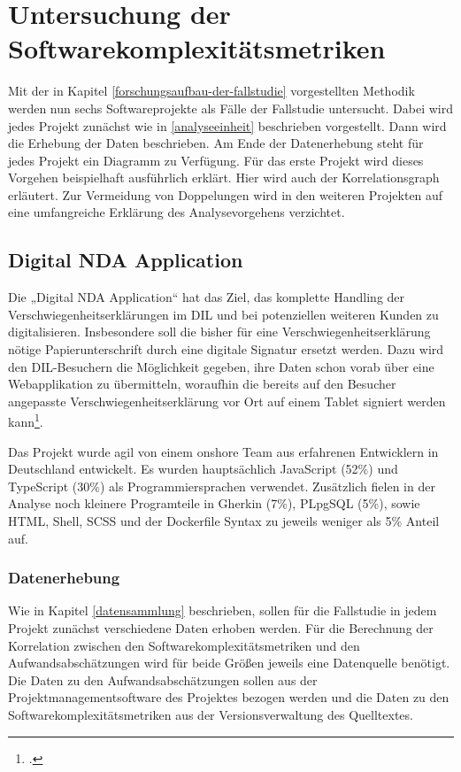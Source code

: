 \chapter{Untersuchung der Softwarekomplexitätsmetriken}\label{untersuchung-der-softwarekomplexituxe4tsmetriken}

Mit der in Kapitel \ref{forschungsaufbau-der-fallstudie} vorgestellten Methodik werden nun sechs
Softwareprojekte als Fälle der Fallstudie untersucht. Dabei wird jedes
Projekt zunächst wie in \ref{analyseeinheit} beschrieben vorgestellt. Dann wird die
Erhebung der Daten beschrieben. Am Ende der Datenerhebung steht für
jedes Projekt ein Diagramm zu Verfügung. Für das erste Projekt wird
dieses Vorgehen beispielhaft ausführlich erklärt. Hier wird auch der
Korrelationsgraph erläutert. Zur Vermeidung von Doppelungen wird in den
weiteren Projekten auf eine umfangreiche Erklärung des Analysevorgehens
verzichtet.

\section{Digital NDA Application}\label{digital-nda-application}

Die „Digital \ac{NDA} Application`` hat das Ziel, das komplette Handling der
Verschwiegenheitserklärungen im \ac{DIL} und bei potenziellen weiteren Kunden
zu digitalisieren. Insbesondere soll die bisher für eine
Verschwiegenheitserklärung nötige Papierunterschrift durch eine digitale
Signatur ersetzt werden. Dazu wird den \ac{DIL}-Besuchern die Möglichkeit
gegeben, ihre Daten schon vorab über eine Webapplikation zu übermitteln,
woraufhin die bereits auf den Besucher angepasste
Verschwiegenheitserklärung vor Ort auf einem Tablet signiert werden
kann\footcite[Vgl. ][]{dxctechnologiesInternesDokumentAufbau2022}.

Das Projekt wurde agil von einem onshore Team aus erfahrenen Entwicklern
in Deutschland entwickelt. Es wurden hauptsächlich JavaScript
(52\%) und TypeScript (30\%)
als Programmiersprachen verwendet. Zusätzlich fielen in der Analyse noch
kleinere Programteile in Gherkin (7\%), PLpgSQL (5\%), sowie \ac{HTML},
Shell, SCSS und der Dockerfile Syntax zu jeweils weniger als 5\% Anteil
auf.

\subsection{Datenerhebung}\label{nda-Datenerhebung}

Wie in Kapitel \ref{datensammlung} beschrieben, sollen für die Fallstudie in jedem
Projekt zunächst verschiedene Daten erhoben werden. Für die Berechnung
der Korrelation zwischen den Softwarekomplexitätsmetriken und den
Aufwandsabschätzungen wird für beide Grö\ss en jeweils eine Datenquelle
benötigt. Die Daten zu den Aufwandsabschätzungen sollen aus der
Projektmanagementsoftware des Projektes bezogen werden und die Daten zu
den Softwarekomplexitätsmetriken aus der Versionsverwaltung des
Quelltextes.

